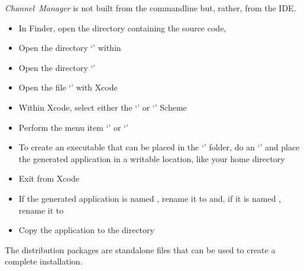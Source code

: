\tertiaryEnd{}
\TBD{}
\tertiaryEnd{}
\TBD{}
\tertiaryEnd{}
\secondaryEnd{}
\textit{Channel~Manager} is not built from the command\longDash{}line but, rather, from
the IDE.
\begin{itemize}
\item In Finder, open the directory containing the \mplusm source code, 
\item\exSp{} Open the directory `' within
\item\exSp{} Open the directory `'
\item\exSp{} Open the file `' with Xcode
\item\exSp{} Within Xcode, select either the `' or
`' Scheme
\item\exSp{} Perform the menu item `' or
`'
\item\exSp{} To create an executable that can be placed in the `'
folder, do an `'
and place the generated application in a writable location, like your home directory
\item\exSp{} Exit from Xcode
\item\exSp{} If the generated application is named , rename
it to  and, if it is named ,
rename it to 
\item\exSp{} Copy the  application to the 
directory
\end{itemize}
\tertiaryEnd{}
\TBD{}
\tertiaryEnd{}
\TBD{}
\tertiaryEnd{}
\secondaryEnd{}
The distribution packages are standalone files that can be used to create a complete
\mplusm{} installation.
